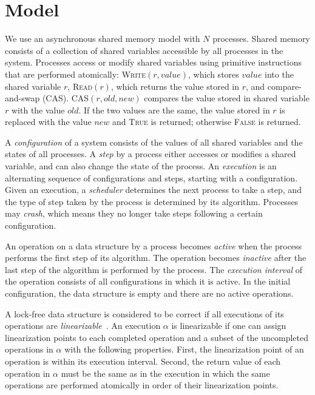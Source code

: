\documentclass[letterpaper]{article}
\begin{document}
\section{Model}\label{section_model}

We use an asynchronous shared memory model with $N$ processes. Shared memory consists of a collection of shared variables accessible by all processes in the system. Processes access or modify shared variables using primitive instructions that are performed atomically: \textsc{Write}$(r, value)$, which stores $value$ into the shared variable $r$, \textsc{Read}$(r)$, which returns the value stored in $r$, and compare-and-swap (CAS). CAS$(r, old, new)$ compares the value stored in shared variable $r$ with the value $old$. If the two values are the same, the value stored in $r$ is replaced with the value $new$ and \textsc{True} is returned; otherwise \textsc{False} is returned. 

A \textit{configuration} of a system consists of the values of all shared variables and the states of all processes. A \textit{step} by a process either accesses or modifies a shared variable, and can also change the state of the process. An \textit{execution} is an alternating sequence of configurations and steps, starting with a configuration.  Given an execution, a \textit{scheduler} determines the next process to take a step, and the type of step taken by the process is determined by its algorithm. Processes may \textit{crash}, which means they no longer take steps following a certain configuration.

An operation on a data structure by a process becomes \textit{active} when the process performs the first step of its algorithm. The operation becomes \textit{inactive} after the last step of the algorithm is performed by the process. The \textit{execution interval} of the operation consists of all configurations in which it is active. In the initial configuration, the data structure is empty and there are no active operations. 

A lock-free data structure is considered to be correct if all executions of its operations are \textit{linearizable}~\cite{AttiyaW04}. An execution $\alpha$ is linearizable if one can assign linearization points to each completed operation and a subset of the uncompleted operations in $\alpha$ with the following properties. First, the linearization point of an operation is within its execution interval. Second, the return value of each operation in $\alpha$ must be the same as in the execution in which the same operations are performed atomically in order of their linearization points. 
\end{document}
